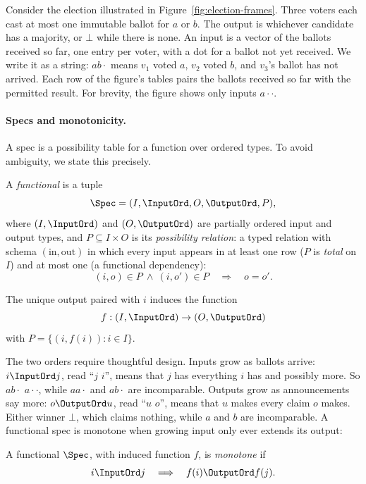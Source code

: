 Consider the election illustrated in
Figure~\ref{fig:election-frames}.  Three voters each cast at most one immutable
ballot for $a$ or $b$.  The output is whichever candidate has a majority, or
$\bot$ while there is none.  An input is a vector of the ballots received so
far, one entry per voter, with a dot for a ballot not yet received.  We write
it as a string: $ab\cdot$ means $v_1$ voted $a$, $v_2$ voted $b$, and $v_3$'s
ballot has not arrived.  Each row of the figure's tables pairs the ballots
received so far with the permitted result.  For brevity, the figure shows only
inputs \inrelpart $a\cdot\cdot$.

\paragraph{Specs and monotonicity.}
A spec is a possibility table for a function over ordered types.  To avoid
ambiguity, we state this precisely.

\begin{definition}
\label{def:functional-specification}
A \emph{functional \spectype} is a tuple
\[
  \Spec=(I,\InputOrd,O,\OutputOrd,P),
\]
  where $(I,\InputOrd)$ and $(O,\OutputOrd)$ are partially ordered input and
  output types, and $P\subseteq I\times O$ is its \emph{possibility relation}:
  a typed relation with schema $(\mathrm{in},\mathrm{out})$ in which every
  input appears in at least one row ($P$ is \emph{total} on $I$) and at most one
  (a functional dependency):
\[
  (i,o)\in P\ \land\ (i,o')\in P
  \quad\Longrightarrow\quad o=o'.
\]
\end{definition}

The unique output paired with $i$ induces the function
\[f:(I,\InputOrd)\to(O,\OutputOrd)\]
with $P=\{(i,f(i)):i\in I\}.$

The two orders require thoughtful design.
Inputs grow as ballots arrive: $i\InputOrd j$, read ``$j$ \emph{\inrel} $i$'', means that
$j$ has everything $i$ has and possibly more. So $ab\cdot$ \inrel $a\cdot\cdot$,
while $aa\cdot$ and $ab\cdot$ are incomparable. Outputs grow as announcements
say more: $o\OutputOrd u$, read ``$u$ \outrel $o$'', means that $u$ makes every
claim $o$ makes. Either winner \outrel $\bot$, which claims nothing, while $a$
and $b$ are incomparable. A functional spec is monotone when growing input only
ever extends its output:


\begin{definition}
\label{def:functional-monotonicity}
A functional \spectype $\Spec$, with induced function $f$, is
\emph{monotone} if
\begin{equation}
  i\InputOrd j
  \quad\Longrightarrow\quad
  f(i)\OutputOrd f(j).
  \label{eq:functional-monotonicity}
\end{equation}
\end{definition}

